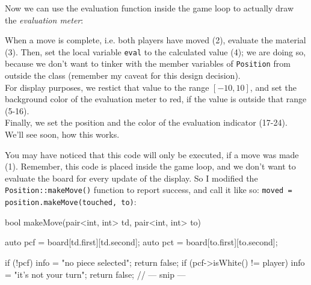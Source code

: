 Now we can use the evaluation function inside the game loop to actually draw the
\emph{evaluation meter}:


When a move is complete, i.e. both players have moved (2), evaluate the material (3).
Then, set the local variable \texttt{eval} to the calculated value (4);
we are doing so, because we don't want to tinker with the member variables of
\texttt{Position} from outside the class (remember my caveat for this design decision).\\
For display purposes, we restict that value to the range $[-10, 10]$, and set the
background color of the evaluation meter to red, if the value is outside
that range (5-16).\\
Finally, we set the position and the color of the evaluation indicator (17-24).
We'll see soon, how this works.

You may have noticed that this code will only be executed, if a move was made (1).
Remember, this code is placed inside the game loop, and we don't want to evaluate the board
for every update of the display.
So I modified the \texttt{Position::makeMove()} function to report success, and call
it like so: \texttt{moved = position.makeMove(touched, to)}:

\begin{cpp}
bool makeMove(pair<int, int> td, pair<int, int> to) {
  auto pcf = board[td.first][td.second];
  auto pct = board[to.first][to.second];

  if (!pcf) {
    info = "no piece selected";
    return false;
  }
  if (pcf->isWhite() != player) {
    info = "it's not your turn";
    return false;
  }
  // --- snip ---
}
\end{cpp}

